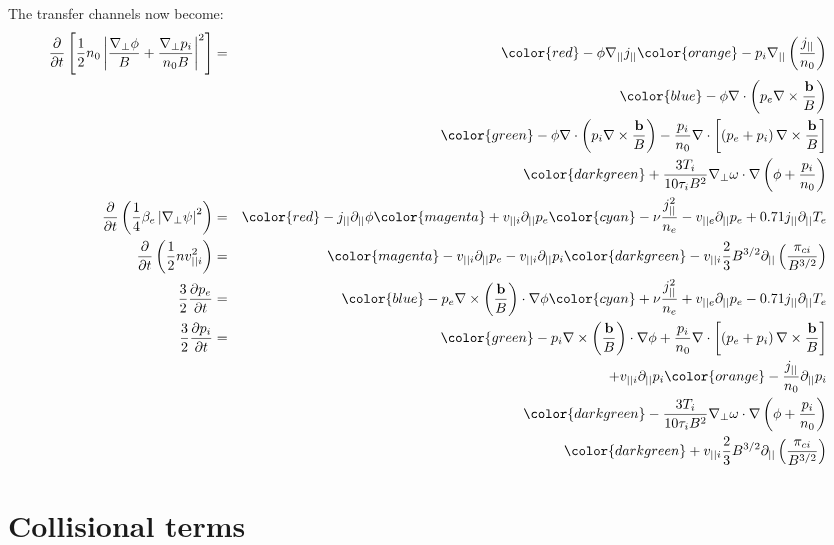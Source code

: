 \documentclass[12pt,a4paper]{article}
\newcommand{\deriv}[2]{\frac{\partial #1}{\partial #2}}
\begin{document}
The transfer channels now become:
\begin{eqnarray}
  \frac{\partial}{\partial t}\left[\frac{1}{2}n_0\left|\frac{\nabla_\perp\phi}{B} + \frac{\nabla_\perp p_i}{n_0B}\right|^2\right] &=& {\color{red}-\phi\nabla_{||}j_{||}} {\color{orange} - p_i\nabla_{||}\left(\frac{j_{||}}{n_0}\right) } \nonumber \\
       && {\color{blue} - \phi\nabla\cdot\left(p_e\nabla\times\frac{\mathbf{b}}{B}\right)} \nonumber \\
  && {\color{green} - \phi\nabla\cdot\left(p_i\nabla\times\frac{\mathbf{b}}{B}\right) - \frac{p_i}{n_0}\nabla\cdot\left[\left(p_e + p_i\right)\nabla\times\frac{\mathbf{b}}{B}\right]} \nonumber \\
  && {\color{darkgreen}+ \frac{3T_i}{10\tau_iB^2}\nabla_\perp\omega\cdot\nabla\left(\phi + \frac{p_i}{n_0}\right)} \\
\frac{\partial}{\partial t}\left(\frac{1}{4}\beta_e\left|\nabla_\perp\psi\right|^2\right) &=& {\color{red} - j_{||}\partial_{||}\phi} {\color{magenta} + v_{||i}\partial_{||}p_e} {\color{cyan} - \nu \frac{j_{||}^2}{n_e} - v_{||e}\partial_{||}p_e + 0.71j_{||}\partial_{||}T_e} \\
\frac{\partial}{\partial t}\left(\frac{1}{2}nv_{||i}^2\right) &=& {\color{magenta} - v_{||i}\partial_{||}p_e} - v_{||i}\partial_{||}p_i {\color{darkgreen}- v_{||i}\frac{2}{3}B^{3/2}\partial_{||}\left(\frac{\pi_{ci}}{B^{3/2}}\right)} \\
 \frac{3}{2}\deriv{p_e}{t} &=& {\color{blue} -p_e\nabla\times\left(\frac{\mathbf{b}}{B}\right)\cdot\nabla\phi} {\color{cyan} + \nu \frac{j_{||}^2}{n_e} + v_{||e}\partial_{||}p_e - 0.71 j_{||}\partial_{||} T_e} \\
 \frac{3}{2}\deriv{p_i}{t} &=& {\color{green} -p_i\nabla\times\left(\frac{\mathbf{b}}{B}\right)\cdot\nabla\phi + \frac{p_i}{n_0}\nabla\cdot\left[\left(p_e + p_i\right)\nabla\times\frac{\mathbf{b}}{B}\right]} \nonumber \\
 && + v_{||i}\partial_{||}p_i {\color{orange} - \frac{j_{||}}{n_0}\partial_{||}p_i} \nonumber \\
 && {\color{darkgreen} - \frac{3T_i}{10\tau_iB^2}\nabla_\perp\omega\cdot\nabla\left(\phi + \frac{p_i}{n_0}\right)} \nonumber \\
 && {\color{darkgreen} + v_{||i}\frac{2}{3}B^{3/2}\partial_{||}\left(\frac{\pi_{ci}}{B^{3/2}}\right)}
\end{eqnarray}


\section{Collisional terms}
\label{sec:collisional}
\end{document}
